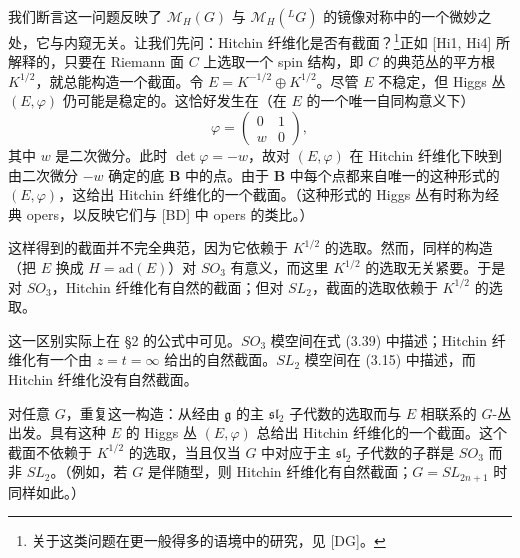
我们断言这一问题反映了 $\mathcal{M}_H(G)$ 与 $\mathcal{M}_H({}^{L}G)$ 的镜像对称中的一个微妙之处，它与内窥无关。让我们先问：Hitchin 纤维化是否有截面？\footnote{关于这类问题在更一般得多的语境中的研究，见 [DG]。}正如 [Hi1, Hi4] 所解释的，只要在 Riemann 面 $C$ 上选取一个 spin 结构，即 $C$ 的典范丛的平方根 $K^{1/2}$，就总能构造一个截面。令 $E=K^{-1/2}\oplus K^{1/2}$。尽管 $E$ 不稳定，但 Higgs 丛 $(E,\varphi)$ 仍可能是稳定的。这恰好发生在（在 $E$ 的一个唯一自同构意义下）
\begin{equation}\tag{10.1}
\varphi = \begin{pmatrix}0&1\\ w&0\end{pmatrix},
\end{equation}
其中 $w$ 是二次微分。此时 $\det\varphi=-w$，故对 $(E,\varphi)$ 在 Hitchin 纤维化下映到由二次微分 $-w$ 确定的底 $\boldsymbol{B}$ 中的点。由于 $\boldsymbol{B}$ 中每个点都来自唯一的这种形式的 $(E,\varphi)$，这给出 Hitchin 纤维化的一个截面。（这种形式的 Higgs 丛有时称为经典 opers，以反映它们与 [BD] 中 opers 的类比。）

这样得到的截面并不完全典范，因为它依赖于 $K^{1/2}$ 的选取。然而，同样的构造（把 $E$ 换成 $H=\mathrm{ad}(E)$）对 $SO_3$ 有意义，而这里 $K^{1/2}$ 的选取无关紧要。于是对 $SO_3$，Hitchin 纤维化有自然的截面；但对 $SL_2$，截面的选取依赖于 $K^{1/2}$ 的选取。

这一区别实际上在 §2 的公式中可见。$SO_3$ 模空间在式 (3.39) 中描述；Hitchin 纤维化有一个由 $z=t=\infty$ 给出的自然截面。$SL_2$ 模空间在 (3.15) 中描述，而 Hitchin 纤维化没有自然截面。

对任意 $G$，重复这一构造：从经由 $\mathfrak{g}$ 的主 $\mathfrak{sl}_2$ 子代数的选取而与 $E$ 相联系的 $G$-丛出发。具有这种 $E$ 的 Higgs 丛 $(E,\varphi)$ 总给出 Hitchin 纤维化的一个截面。这个截面不依赖于 $K^{1/2}$ 的选取，当且仅当 $G$ 中对应于主 $\mathfrak{sl}_2$ 子代数的子群是 $SO_3$ 而非 $SL_2$。（例如，若 $G$ 是伴随型，则 Hitchin 纤维化有自然截面；$G=SL_{2n+1}$ 时同样如此。）

